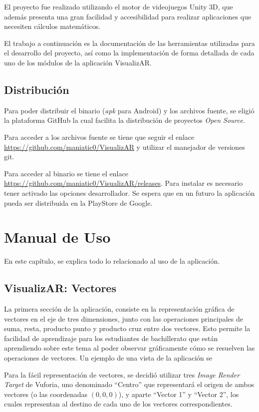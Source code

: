 El proyecto fue realizado utilizando el motor de videojuegos Unity 3D, que además presenta una gran facilidad y accesibilidad para realizar aplicaciones que necesiten cálculos matemáticos. 

El trabajo a continuación es la documentación de las herramientas utilizadas para el desarrollo del proyecto, así como la implementación de forma detallada de cada uno de los módulos de la aplicación VisualizAR.

\section{Distribución}
Para poder distribuir el binario (\textit{apk} para Android) y los archivos fuente, se eligió la plataforma GitHub la cual facilita la distribución de proyectos \textit{Open Source}. 

Para acceder a los archivos fuente se tiene que seguir el enlace \url{https://github.com/maniatic0/VisualizAR} y utilizar el manejador de versiones git.

Para acceder al binario se tiene el enlace \url{https://github.com/maniatic0/VisualizAR/releases}. Para instalar es necesario tener activado las opciones desarrollador. Se espera que en un futuro la aplicación pueda ser distribuida en la PlayStore de Google.


\chapter{Manual de Uso}
En este capítulo, se explica todo lo relacionado al uso de la aplicación.

\section{VisualizAR: Vectores}
La primera sección de la aplicación, consiste en la representación gráfica de vectores en el eje de tres dimensiones, junto con las operaciones principales de suma, resta, producto punto y producto cruz entre dos vectores. Esto permite la facilidad de aprendizaje para los estudiantes de bachillerato que están aprendiendo sobre este tema al poder observar gráficamente cómo se resuelven las operaciones de vectores. Un ejemplo de una vista de la aplicación se

Para la fácil representación de vectores, se decidió utilizar tres \textit{Image Render Target} de Vuforia, uno denominado “Centro” que representará el origen de ambos vectores (o las coordenadas $(0,0,0)$), y aparte “Vector 1” y “Vector 2”, los cuales representan al destino de cada uno de los vectores correspondientes.


